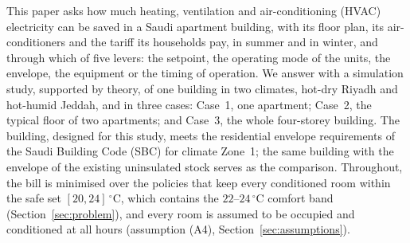 \documentclass[10pt,a4paper,twocolumn]{article}
\theoremstyle{definition}
\begin{document}
This paper asks how much heating, ventilation and air-conditioning (HVAC) electricity can be saved in a Saudi apartment building, with its floor plan, its air-conditioners and the tariff its households pay, in summer and in winter, and through which of five levers: the setpoint, the operating mode of the units, the envelope, the equipment or the timing of operation. We answer with a simulation study, supported by theory, of one building in two climates, hot-dry Riyadh and hot-humid Jeddah, and in three cases: Case~1, one apartment; Case~2, the typical floor of two apartments; and Case~3, the whole four-storey building. The building, designed for this study, meets the residential envelope requirements of the Saudi Building Code (SBC) for climate Zone~1; the same building with the envelope of the existing uninsulated stock serves as the comparison. Throughout, the bill is minimised over the policies that keep every conditioned room within the safe set $[20,24]\,^{\circ}$C, which contains the $22$--$24\,^{\circ}$C comfort band (Section~\ref{sec:problem}), and every room is assumed to be occupied and conditioned at all hours (assumption (A4), Section~\ref{sec:assumptions}).
\end{document}
